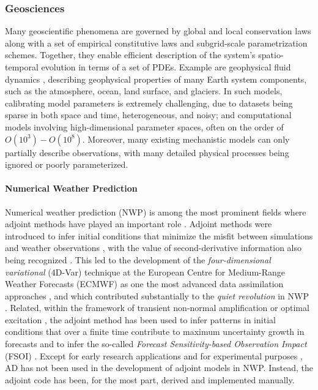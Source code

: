 \subsubsection{Geosciences}

Many geoscientific phenomena are governed by global and local conservation laws along with a set of empirical constitutive laws and subgrid-scale parametrization schemes. 
Together, they enable efficient description of the system's spatio-temporal evolution in terms of a set of PDEs.
Example are geophysical fluid dynamics \cite{Vallis:2016kv}, describing geophysical properties of many Earth system components, such as the atmosphere, ocean, land surface, and glaciers.
In such models, calibrating model parameters is extremely challenging, due to datasets being sparse in both space and time, heterogeneous, and noisy; and computational models involving high-dimensional parameter spaces, often on the order of $O(10^3) - O(10^8)$.
Moreover, many existing mechanistic models can only partially describe observations, with many detailed physical processes being ignored or poorly parameterized. 


\paragraph{Numerical Weather Prediction}
\label{section:meteorlogy}

Numerical weather prediction (NWP) is among the most prominent fields where adjoint methods have played an important role \cite{Errico_1997}. 
Adjoint methods were introduced to infer initial conditions that minimize the misfit between simulations and weather observations \cite{Lewis.1985,Talagrand.1987,Courtier.1987}, with the value of second-derivative information also being recognized \cite{Dimet.2002}. 
This led to the development of the \textit{four-dimensional variational} (4D-Var) technique at the European Centre for Medium-Range Weather Forecasts (ECMWF) as one the most advanced data assimilation approaches \cite{Rabier.1992,Rabier:2000uu}, and which contributed substantially to the \textit{quiet revolution} in NWP \cite{Bauer.2015}.
Related, within the framework of transient non-normal amplification or optimal excitation \cite{Farrell.1988,Farrell:1996jx}, the adjoint method has been used to infer patterns in initial conditions that over a finite time contribute to maximum uncertainty growth in forecasts \cite{Palmer:1994br,Buizza:1995in} and to infer the so-called \textit{Forecast Sensitivity-based Observation Impact} (FSOI) \cite{Langland:2004jo}.
Except for early research applications \cite{Park.1996,Park.2000} and for experimental purposes \cite{Giering.2006}, AD has not been used in the development of adjoint models in NWP.
Instead, the adjoint code has been, for the most part, derived and implemented manually.

